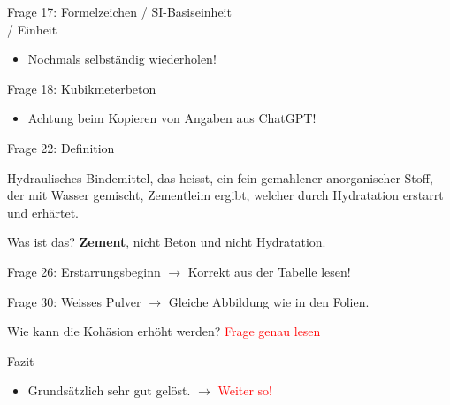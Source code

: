 \begin{frame}{Frage 17: Formelzeichen / SI-Basiseinheit \\ / Einheit}

    \begin{itemize}
        \item Nochmals selbständig wiederholen!
    \end{itemize}

\end{frame}

\begin{frame}{Frage 18: Kubikmeterbeton}

    \begin{itemize}
        \item Achtung beim Kopieren von Angaben aus ChatGPT!
    \end{itemize}

\end{frame}


\begin{frame}{Frage 22: Definition}

    Hydraulisches Bindemittel, das heisst, ein fein gemahlener anorganischer Stoff, der mit Wasser gemischt, Zementleim
    ergibt, welcher durch Hydratation erstarrt und erhärtet.

    \vspace{\baselineskip}
    \begin{block}{Was ist das?}
        \pause
        \textbf{Zement}, nicht Beton und nicht Hydratation.
    \end{block}

\end{frame}

\begin{frame}{Frage 26: Erstarrungsbeginn}
    $\rightarrow$ Korrekt aus der Tabelle lesen!
\end{frame}


\begin{frame}{Frage 30: Weisses Pulver}
    $\rightarrow$ Gleiche Abbildung wie in den Folien.

\end{frame}

\begin{frame}{Wie kann die Kohäsion erhöht werden?}
    \textcolor{red}{Frage genau lesen}

\end{frame}

\begin{frame}{Fazit}
    \begin{itemize}
        \item [\textbullet] Grundsätzlich sehr gut gelöst. $\rightarrow$ \textcolor{red}{Weiter so!}
    \end{itemize}

\end{frame}

